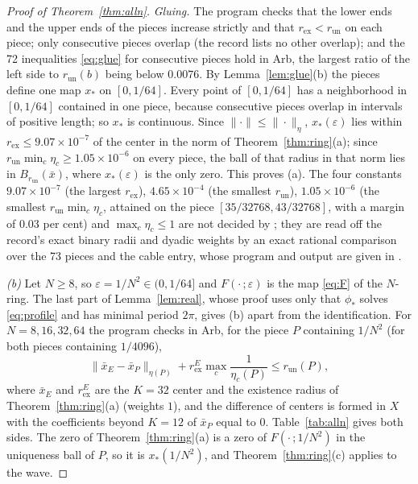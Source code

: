 \documentclass[11pt]{article}
\theoremstyle{definition}
\begin{document}
\begin{proof}[Proof of Theorem~\ref{thm:alln}]
\emph{Gluing.} The program checks that the lower ends and the upper ends of the pieces increase strictly and that $r_{\mathrm{ex}} < r_{\mathrm{un}}$ on each piece; only consecutive pieces overlap (the record lists no other overlap); and the 72 inequalities \eqref{eq:glue} for consecutive pieces hold in Arb, the largest ratio of the left side to $r_{\mathrm{un}}(b)$ being below $0.0076$. By Lemma~\ref{lem:glue}(b) the pieces define one map $x_*$ on $[0, 1/64]$. Every point of $[0, 1/64]$ has a neighborhood in $[0, 1/64]$ contained in one piece, because consecutive pieces overlap in intervals of positive length; so $x_*$ is continuous. Since $\|\cdot\| \le \|\cdot\|_\eta$, $x_*(\varepsilon)$ lies within $r_{\mathrm{ex}} \le 9.07 \times 10^{-7}$ of the center in the norm of Theorem~\ref{thm:ring}(a); since $r_{\mathrm{un}}\min_c\eta_c \ge 1.05 \times 10^{-6}$ on every piece, the ball of that radius in that norm lies in $B_{r_{\mathrm{un}}}(\bar x)$, where $x_*(\varepsilon)$ is the only zero. This proves (a). The four constants $9.07 \times 10^{-7}$ (the largest $r_{\mathrm{ex}}$), $4.65 \times 10^{-4}$ (the smallest $r_{\mathrm{un}}$), $1.05 \times 10^{-6}$ (the smallest $r_{\mathrm{un}}\min_c\eta_c$, attained on the piece $[35/32768, 43/32768]$, with a margin of $0.03$ per cent) and $\max_c\eta_c \le 1$ are not decided by ; they are read off the record's exact binary radii and dyadic weights by an exact rational comparison over the 73 pieces and the cable entry, whose program and output are given in .

\emph{(b)} Let $N \ge 8$, so $\varepsilon = 1/N^2 \in (0, 1/64]$ and $F(\cdot\,;\varepsilon)$ is the map \eqref{eq:F} of the $N$-ring. The last part of Lemma~\ref{lem:real}, whose proof uses only that $\phi_*$ solves \eqref{eq:profile} and has minimal period $2\pi$, gives (b) apart from the identification. For $N = 8, 16, 32, 64$ the program checks in Arb, for the piece $P$ containing $1/N^2$ (for both pieces containing $1/4096$),
\begin{equation}\label{eq:incl}
  \|\bar x_E - \bar x_P\|_{\eta(P)} + r^E_{\mathrm{ex}}\max_c\frac1{\eta_c(P)} \le r_{\mathrm{un}}(P),
\end{equation}
where $\bar x_E$ and $r^E_{\mathrm{ex}}$ are the $K = 32$ center and the existence radius of Theorem~\ref{thm:ring}(a) (weights $1$), and the difference of centers is formed in $X$ with the coefficients beyond $K = 12$ of $\bar x_P$ equal to $0$. Table~\ref{tab:alln} gives both sides. The zero of Theorem~\ref{thm:ring}(a) is a zero of $F(\cdot\,;1/N^2)$ in the uniqueness ball of $P$, so it is $x_*(1/N^2)$, and Theorem~\ref{thm:ring}(c) applies to the wave.


\end{proof}
\end{document}
